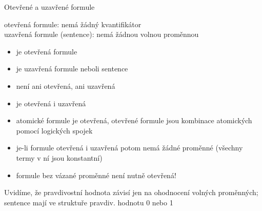 \documentclass{beamer}
\begin{document}
\begin{frame}{Otevřené a uzavřené formule}

    \alert{otevřená formule:} nemá žádný kvantifikátor\\
    \alert{uzavřená formule (sentence):} nemá žádnou volnou proměnnou  

     \begin{itemize}
        \item {} je otevřená formule
        \item {} je uzavřená formule  neboli sentence
        \item {} není ani otevřená, ani uzavřená
        \item {} je otevřená i uzavřená
        \item atomické formule je otevřená, otevřené formule jsou kombinace atomických pomocí logických spojek
        \item je-li formule otevřená i uzavřená potom nemá žádné proměnné (všechny termy v ní jsou konstantní)
        \item formule bez vázané proměnné není nutně otevřená!
    \end{itemize}

    Uvidíme, že \alert{pravdivostní hodnota} závisí jen na ohodnocení volných proměnných; \alert{sentence} mají ve struktuře pravdiv. hodnotu 0 nebo 1
    
\end{frame}
\end{document}
